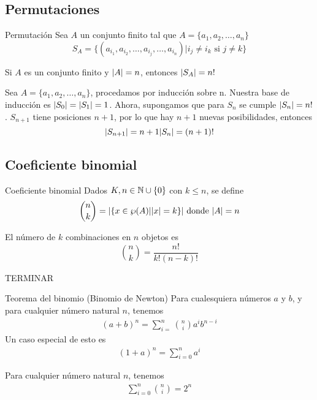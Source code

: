 	\subsection{Permutaciones}
		\begin{definition}{Permutación}
			Sea $A$ un conjunto finito tal que $A=\{a_1,a_2,\dotso,a_n\}$
			$$S_A=\{(a_{i_1},a_{i_2},\dotso,a_{i_j},\dotso,a_{i_n})|i_j\neq i_k\text{ si } j\neq k\}$$
		\end{definition}
		\begin{theorem}{}
			Si $A$ es un conjunto finito y $\abs{A}=n$, entonces $\abs{S_A}=n!$
		\end{theorem}
		\begin{demostration}{}
			Sea $A=\{a_1,a_2,\dotso,a_n\}$, procedamos por inducción sobre n.
			Nuestra base de inducción es $\abs{S_0}=\abs{S_1}=1$.
			Ahora, supongamos que para $S_n$ se cumple $\abs{S_n}=n!$.
			$S_{n+1}$ tiene posiciones $n+1$, por lo que hay $n+1$ nuevas posibilidades, entonces
			$$\abs{S_{n+1}}=n+1\abs{S_n}=(n+1)!$$
		\end{demostration}
	\subsection{Coeficiente binomial}
		\begin{definition}{Coeficiente binomial}
			Dados $K,n\in\mathbb{N}\cup\{0\}$ con $k\le n$, se define $$\binom{n}{k}=\abs{\{x\in\wp(A)|\abs{x}=k\}}\text{ donde }\abs{A}=n$$
		\end{definition}
		\begin{theorem}{}
			El número de $k$ combinaciones en $n$ objetos es
			$$\binom{n}{k}=\frac{n!}{k!(n-k)!}$$
		\end{theorem}
		\begin{demostration}{}
			TERMINAR
		\end{demostration}
		\begin{theorem}{Teorema del binomio (Binomio de Newton)}
			Para cualesquiera números $a$ y $b$, y para cualquier número natural $n$, tenemos
			\begin{align*}
				(a+b)^n=\sum_{i=}^{n}{\binom{n}{i}a^{i}b^{n-i}}
			\end{align*}
			Un caso especial de esto es 
			\begin{align*}
				(1+a)^n=\sum_{i=0}^{n}a^i
			\end{align*}
		\end{theorem}
		\begin{demostration}{}
			
		\end{demostration}
		\begin{corollary}{}
			Para cualquier número natural $n$, tenemos
			\begin{align*}
				\sum_{i=0}^{n}{\binom{n}{i}}=2^n
			\end{align*}
		\end{corollary}
